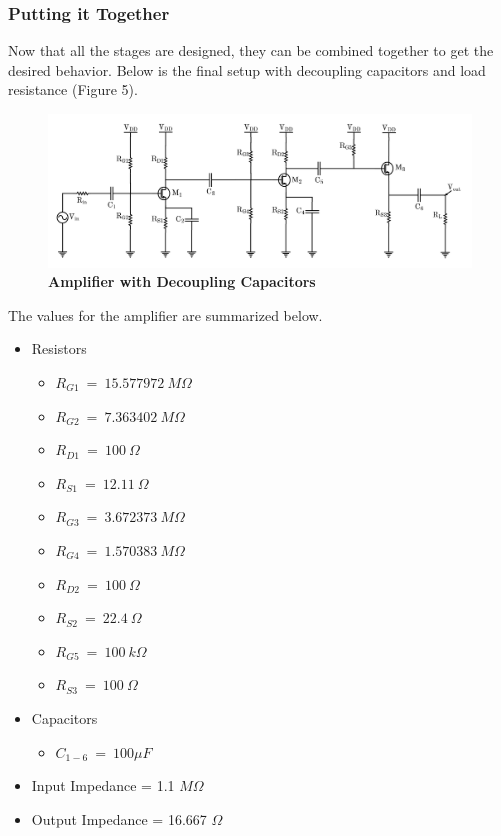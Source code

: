 \documentclass{article}
\begin{document}
\subsubsection{Putting it Together}
Now that all the stages are designed, they can be combined together to get the desired behavior. Below is the final setup with decoupling capacitors and load resistance (Figure 5).
    \begin{figure}[H]
        \centerline{\includegraphics[width=\textwidth]{diagram}}
        \caption{\textbf{Amplifier with Decoupling Capacitors}}
	\end{figure}
   \noindent The values for the amplifier are summarized below.\\ 
    \begin{itemize}
        \item Resistors
        \begin{itemize}
        \item $R_{G1}\ =\ 15.577972\ M\Omega$ 
        \item $R_{G2}\ =\ 7.363402\ M\Omega$
        \item $R_{D1}\ =\ 100\ \Omega$
        \item $R_{S1}\ =\ 12.11\ \Omega$
        \item $R_{G3}\ =\ 3.672373\ M\Omega$ 
        \item $R_{G4}\ =\ 1.570383\ M\Omega$
        \item $R_{D2}\ =\ 100\ \Omega$
        \item $R_{S2}\ =\ 22.4\ \Omega$
        \item $R_{G5}\ =\ 100\ k\Omega$ 
        \item $R_{S3}\ =\ 100\ \Omega$
        \end{itemize}
        \item Capacitors
        \begin{itemize}
            \item $C_{1-6}\ =\ 100 \mu F$
        \end{itemize}
        \item Input Impedance = 1.1 $M\Omega$
        \item Output Impedance = 16.667 $\Omega$
    \end{itemize}
\newpage
\end{document}
